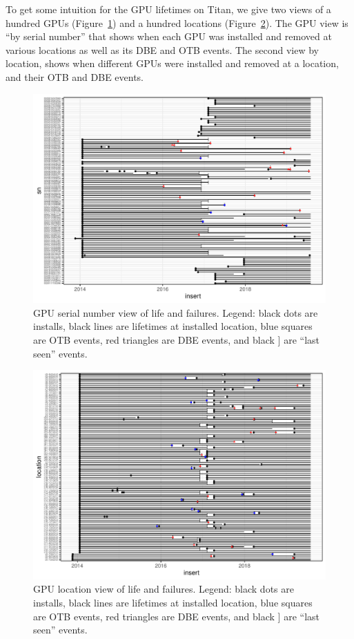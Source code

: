 To get some intuition for the GPU lifetimes on Titan, we give two views of
a hundred GPUs (Figure~\ref{fig:gpuview}) and a hundred locations
(Figure~\ref{fig:locview}). The GPU view is ``by serial number'' that
shows when each GPU was installed and removed at various locations as
well as its DBE and OTB events. The second view by location, shows
when different GPUs were installed and removed at a location, and
their OTB and DBE events.
\begin{figure}[tb]
  \includegraphics[width=6.5in]{figs/sample_sn.pdf}
  \caption{GPU serial number view of life and failures. Legend: black
    dots are installs, black lines are lifetimes at installed
    location, blue squares are OTB events, red triangles are DBE
    events, and black ] are ``last seen'' events.}
  \label{fig:gpuview}
\end{figure}
\begin{figure}[tb]
  \includegraphics[width=6.5in]{figs/sample_loc.pdf}
  \caption{GPU location view of life and failures.  Legend: black
    dots are installs, black lines are lifetimes at installed
    location, blue squares are OTB events, red triangles are DBE
    events, and black ] are ``last seen'' events.}
  \label{fig:locview}
\end{figure}
